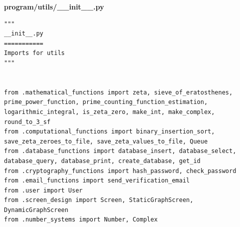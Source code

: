 \documentclass{article}
\begin{document}
\textbf{program/utils/\_\_init\_\_.py}
\begin{lstlisting}
"""
__init__.py
===========
Imports for utils
"""


from .mathematical_functions import zeta, sieve_of_eratosthenes, prime_power_function, prime_counting_function_estimation, logarithmic_integral, is_zeta_zero, make_int, make_complex, round_to_3_sf
from .computational_functions import binary_insertion_sort, save_zeta_zeroes_to_file, save_zeta_values_to_file, Queue
from .database_functions import database_insert, database_select, database_query, database_print, create_database, get_id
from .cryptography_functions import hash_password, check_password
from .email_functions import send_verification_email
from .user import User
from .screen_design import Screen, StaticGraphScreen, DynamicGraphScreen
from .number_systems import Number, Complex
\end{lstlisting}
\end{document}
